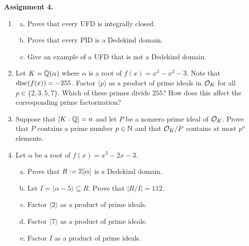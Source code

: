 {\bf Assignment 4.} 
\begin{enumerate}[leftmargin=1.5cm, label={{\bf A4-\arabic*}}]
    \item \label{A4-1} \begin{enumerate}[(a)]
        \item Prove that every UFD is integrally closed.
        \item Prove that every PID is a Dedekind domain.
        \item Give an example of a UFD that is not a Dedekind domain.
    \end{enumerate}
    \item \label{A4-2} Let $K = \mathbb{Q}(\alpha)$ where $\alpha$ is a root of 
    $f(x) = x^3 - x^2 - 3$. Note that $\operatorname{disc}(f(x)) = -255$. Factor 
    $\langle p \rangle$ as a product of prime ideals in ${\cal O}_K$ 
    for all $p \in \{2, 3, 5, 7\}$. Which of these primes divide $255$? 
    How does this affect the corresponding prime factorization?
    \item \label{A4-3} Suppose that $[K : \mathbb{Q}] = n$ and let $P$ be a nonzero prime 
    ideal of ${\cal O}_K$. Prove that $P$ contains a prime number $p \in \mathbb{N}$ 
    and that ${\cal O}_K/P$ contains at most $p^n$ elements. 
    \item \label{A4-4} Let $\alpha$ be a root of $f(x) = x^3 - 2x - 3$. 
    \begin{enumerate}[(a)]
        \item Prove that $R := \mathbb{Z}[\alpha]$ is a Dedekind domain.
        \item Let $I = \langle \alpha - 5 \rangle \subseteq R$. Prove that $|R/I| = 112$. 
        \item Factor $\langle 2 \rangle$ as a product of prime ideals. 
        \item Factor $\langle 7 \rangle$ as a product of prime ideals. 
        \item Factor $I$ as a product of prime ideals. 
    \end{enumerate}
\end{enumerate}

